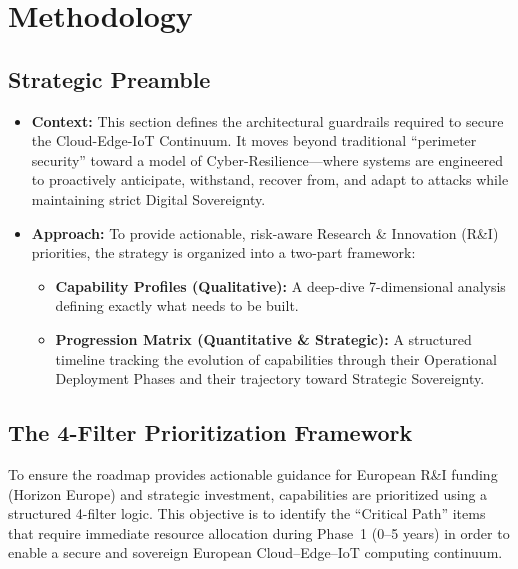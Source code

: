 \documentclass[12pt,a4paper]{article}
\begin{document}
\section{Methodology}

\subsection{Strategic Preamble}
\begin{itemize}
    \item \textbf{Context:} This section defines the architectural guardrails required to secure the Cloud-Edge-IoT Continuum. It moves beyond traditional ``perimeter security''  toward a model of Cyber-Resilience---where systems are engineered to proactively anticipate, withstand, recover from, and adapt to attacks while maintaining strict Digital Sovereignty.
    \item \textbf{Approach:} To provide actionable, risk-aware Research \& Innovation (R\&I) priorities, the strategy is organized into a two-part framework:
    \begin{itemize}
        \item \textbf{Capability Profiles (Qualitative):} A deep-dive 7-dimensional analysis defining exactly what needs to be built.
        \item \textbf{Progression Matrix (Quantitative \& Strategic):} A structured timeline tracking the evolution of capabilities through their Operational Deployment Phases and their trajectory toward Strategic Sovereignty.
    \end{itemize}
\end{itemize}


\subsection{The 4-Filter Prioritization Framework}
To ensure the roadmap provides actionable guidance for European R\&I funding (Horizon Europe) and strategic investment, capabilities are prioritized using a structured 4-filter logic. This objective is to identify the ``Critical Path''  items that require immediate resource allocation during
Phase~1 (0–5 years) in order to enable a secure and sovereign European
Cloud–Edge–IoT computing continuum.
\end{document}
